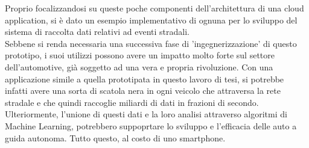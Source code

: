 Proprio focalizzandosi su queste poche componenti dell'architettura di una cloud application, si è dato un esempio implementativo di ognuna per lo sviluppo del sistema di raccolta dati relativi ad eventi stradali. \\
Sebbene si renda necessaria una successiva fase di 'ingegnerizzazione' di questo prototipo, i suoi utilizzi possono avere un impatto molto forte sul settore dell'automotive, già soggetto ad una vera e propria rivoluzione. Con una applicazione simile a quella prototipata in questo lavoro di tesi, si potrebbe infatti avere una sorta di scatola nera in ogni veicolo che attraversa la rete stradale e che quindi raccoglie miliardi di dati in frazioni di secondo. Ulteriormente, l'unione di questi dati e la loro analisi attraverso algoritmi di Machine Learning, potrebbero suppoprtare lo sviluppo e l'efficacia delle auto a guida autonoma. Tutto questo, al costo di uno smartphone.\\

